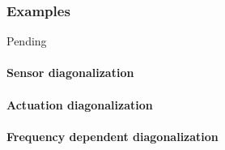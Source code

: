 \subsubsection{Examples}
Pending
\paragraph{Sensor diagonalization}
\paragraph{Actuation diagonalization}
\paragraph{Frequency dependent diagonalization}
